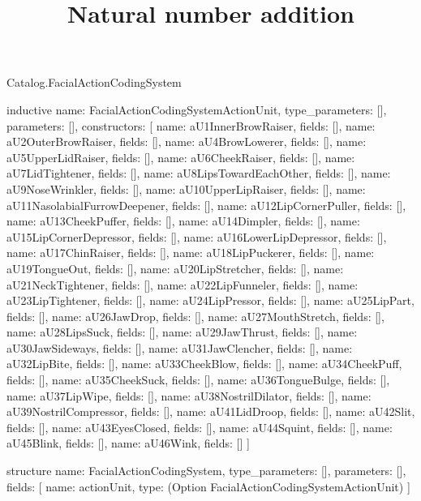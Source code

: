 \begin{lexlean}{Catalog.FacialActionCodingSystem}
\title{Natural number addition}
\begin{semanticmodule}
inductive{
  name: FacialActionCodingSystemActionUnit,
  type_parameters: [],
  parameters: [],
  constructors: [
    {name: aU1InnerBrowRaiser, fields: []},
    {name: aU2OuterBrowRaiser, fields: []},
    {name: aU4BrowLowerer, fields: []},
    {name: aU5UpperLidRaiser, fields: []},
    {name: aU6CheekRaiser, fields: []},
    {name: aU7LidTightener, fields: []},
    {name: aU8LipsTowardEachOther, fields: []},
    {name: aU9NoseWrinkler, fields: []},
    {name: aU10UpperLipRaiser, fields: []},
    {name: aU11NasolabialFurrowDeepener, fields: []},
    {name: aU12LipCornerPuller, fields: []},
    {name: aU13CheekPuffer, fields: []},
    {name: aU14Dimpler, fields: []},
    {name: aU15LipCornerDepressor, fields: []},
    {name: aU16LowerLipDepressor, fields: []},
    {name: aU17ChinRaiser, fields: []},
    {name: aU18LipPuckerer, fields: []},
    {name: aU19TongueOut, fields: []},
    {name: aU20LipStretcher, fields: []},
    {name: aU21NeckTightener, fields: []},
    {name: aU22LipFunneler, fields: []},
    {name: aU23LipTightener, fields: []},
    {name: aU24LipPressor, fields: []},
    {name: aU25LipPart, fields: []},
    {name: aU26JawDrop, fields: []},
    {name: aU27MouthStretch, fields: []},
    {name: aU28LipsSuck, fields: []},
    {name: aU29JawThrust, fields: []},
    {name: aU30JawSideways, fields: []},
    {name: aU31JawClencher, fields: []},
    {name: aU32LipBite, fields: []},
    {name: aU33CheekBlow, fields: []},
    {name: aU34CheekPuff, fields: []},
    {name: aU35CheekSuck, fields: []},
    {name: aU36TongueBulge, fields: []},
    {name: aU37LipWipe, fields: []},
    {name: aU38NostrilDilator, fields: []},
    {name: aU39NostrilCompressor, fields: []},
    {name: aU41LidDroop, fields: []},
    {name: aU42Slit, fields: []},
    {name: aU43EyesClosed, fields: []},
    {name: aU44Squint, fields: []},
    {name: aU45Blink, fields: []},
    {name: aU46Wink, fields: []}
  ]
}

structure{
  name: FacialActionCodingSystem,
  type_parameters: [],
  parameters: [],
  fields: [
    {name: actionUnit, type: (Option FacialActionCodingSystemActionUnit)}
  ]
}
\end{semanticmodule}
\end{lexlean}
